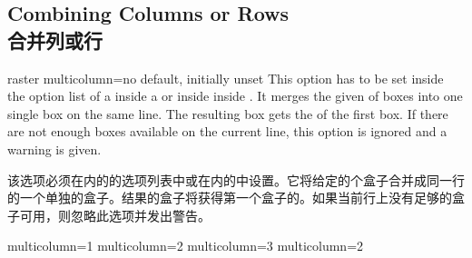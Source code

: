 
\subsection{Combining Columns or Rows\\合并列或行}\label{subsec:raster_multicolrow}

\begin{docTcbKey}[][doc new=2016-02-19]{raster multicolumn}{=}{no default, initially unset}
This option has to be set inside the option list of a 
inside a  or inside  inside .
It merges the given  of boxes into one single box
on the same line. The resulting box gets the 
of the first box.
If there are not enough boxes available on the current line, this option
is ignored and a warning is given.

该选项必须在内的的选项列表中或在内的中设置。它将给定的个盒子合并成同一行的一个单独的盒子。结果的盒子将获得第一个盒子的。如果当前行上没有足够的盒子可用，则忽略此选项并发出警告。
\begin{dispExample}
\begin{tcbitemize}[raster equal height=rows,raster columns=3,
title=\thetcbrasternum,colframe=red!50!black,colback=red!10!white]
\tcbitem[colframe=blue!50!black,colback=blue!10!white,raster multicolumn=1]
multicolumn=1
\tcbitem
\tcbitem
\tcbitem[colframe=blue!50!black,colback=blue!10!white,raster multicolumn=2]
multicolumn=2
\tcbitem
\tcbitem[colframe=blue!50!black,colback=blue!10!white,raster multicolumn=3]
multicolumn=3
\tcbitem
\tcbitem[colframe=blue!50!black,colback=blue!10!white,raster multicolumn=2]
multicolumn=2
\end{tcbitemize}
\end{dispExample}
\end{docTcbKey}



